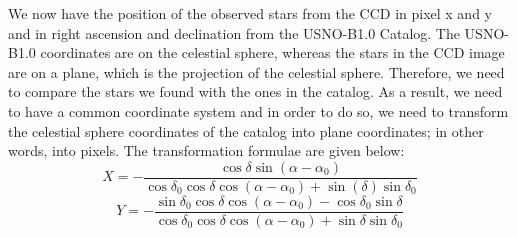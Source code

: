 \documentclass[letterpaper,12pt]{article}
\begin{document}
We now have the position of the observed stars from the CCD in pixel x and y and in right ascension and declination from the USNO-B1.0 Catalog. The USNO-B1.0 coordinates are on the celestial sphere, whereas the stars in the CCD image are on a plane, which is the projection of the celestial sphere. Therefore, we need to compare the stars we found with the ones in the catalog. As a result, we need to have a common coordinate system and in order to do so, we need to transform the celestial sphere coordinates of the catalog into plane coordinates; in other words, into pixels. The transformation formulae are given below:
\begin{equation}
X=- \frac{\cos \delta\sin (\alpha-\alpha_{0})}{\cos \delta_{0}\cos \delta\cos(\alpha-\alpha_{0})+\sin(\delta)\sin\delta_{0}}
\end{equation}
\begin{equation}
Y=- \frac{\sin\delta_{0}\cos\delta\cos(\alpha-\alpha_{0})-\cos\delta_{0}\sin\delta}{\cos \delta_{0}\cos \delta\cos(\alpha-\alpha_{0})+\sin\delta\sin\delta_{0}}
\end{equation}                                    
\end{document}
